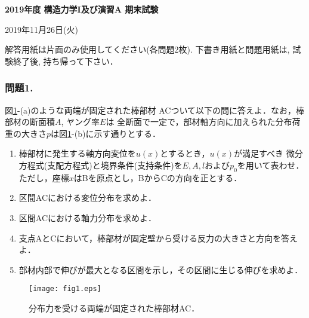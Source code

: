 \documentclass[10pt,a4j]{jarticle}
\newlength{\minitwocolumn}
\begin{document}
\newcommand{\fat}[1]{\mbox{\boldmath $#1$}}
\newcommand{\D}{\partial}
\newcommand{\w}{\omega}
\newcommand{\ga}{\alpha}
\newcommand{\gb}{\beta}
\newcommand{\gx}{\xi}
\newcommand{\gz}{\zeta}
\newcommand{\vhat}[1]{\hat{\fat{#1}}}
\newcommand{\spc}{\vspace{0.7\baselineskip}}
\newcommand{\halfspc}{\vspace{0.3\baselineskip}}

\newcommand{\twofig}[2]
 {
   \begin{figure}[here]
     \begin{minipage}[t]{\minitwocolumn}
         \begin{center}   #1
         \end{center}
     \end{minipage}
         \hspace{\columnsep}
     \begin{minipage}[t]{\minitwocolumn}
         \begin{center} #2
         \end{center}
     \end{minipage}
   \end{figure}
 }
\begin{center}
{\Large \bf 2019年度 構造力学I及び演習A 期末試験} \\
\end{center}
\begin{flushright}
	2019年11月26日(火)
\end{flushright}
解答用紙は片面のみ使用してください(各問題2枚). 
下書き用紙と問題用紙は, 試験終了後, 持ち帰って下さい．
%
%
%
\subsubsection*{問題1.}
図\ref{fig:fig1}-(a)のような両端が固定された棒部材
ACついて以下の問に答えよ．なお，棒部材の断面積$A$, ヤング率$E$は
全断面で一定で，部材軸方向に加えられた分布荷重の大きさ$p$は図\ref{fig:fig1}-(b)に示す通りとする．
\begin{enumerate}
\item
	棒部材に発生する軸方向変位を$u(x)$とするとき，$u(x)$が満足すべき
	微分方程式(支配方程式)と境界条件(支持条件)を$E, A, l$および$p_0$を用いて表わせ．
	ただし，座標$x$はBを原点とし，BからCの方向を正とする．
\item
	区間ACにおける変位分布を求めよ．
\item	
	区間ACにおける軸力分布を求めよ．
\item	
	支点AとCにおいて，棒部材が固定壁から受ける反力の大きさと方向を答えよ．
\item
	部材内部で伸びが最大となる区間を示し，その区間に生じる伸びを求めよ．
\end{enumerate}
\begin{figure}[h]
	\begin{center}
	\texttt{[image: fig1.eps]} 
	\end{center}
	\caption{分布力を受ける両端が固定された棒部材AC．}
	\label{fig:fig1}
\end{figure}
\newpage
\end{document}
